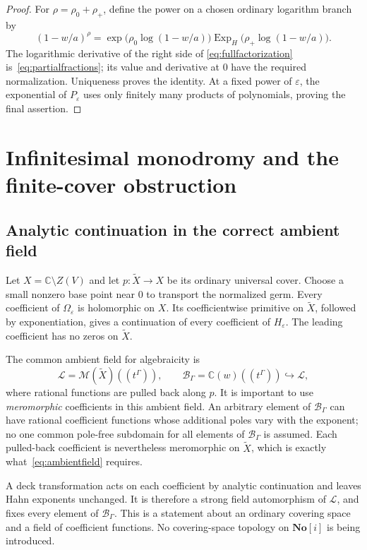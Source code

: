 \documentclass[11pt,a4paper]{article}
\numberwithin{equation}{section}
\theoremstyle{definition}
\theoremstyle{remark}
\newcommand{\C}{\mathbb C}
\newcommand{\No}{\mathbf{No}}
\newcommand{\B}{\mathscr B_\Gamma}
\newcommand{\eps}{\varepsilon}
\newcommand{\Mer}{\mathcal M}
\newcommand{\ExpH}{\operatorname{Exp}_{\!H}}
\newcommand{\Ucov}{\widetilde X}
\begin{document}
\begin{proof}
For $\rho=\rho_0+\rho_+$, define the power on a chosen ordinary logarithm
branch by
\[
 (1-w/a)^\rho
  =\exp\bigl(\rho_0\log(1-w/a)\bigr)
     \ExpH\bigl(\rho_+\log(1-w/a)\bigr).
\]
The logarithmic derivative of the right side of
\eqref{eq:fullfactorization} is~\eqref{eq:partialfractions}; its value and
derivative at $0$ have the required normalization.  Uniqueness proves the
identity.  At a fixed power of $\eps$, the exponential of $P_\eps$ uses
only finitely many products of polynomials, proving the final assertion.
\end{proof}

\section{Infinitesimal monodromy and the finite-cover obstruction}
\label{sec:monodromy}

\subsection{Analytic continuation in the correct ambient field}

Let $X=\C\setminus Z(V)$ and let $p:\Ucov\to X$ be its ordinary universal
cover.  Choose a small nonzero base point near $0$ to transport the
normalized germ.  Every coefficient of $\Omega_\eps$ is holomorphic on $X$.
Its coefficientwise primitive on $\Ucov$, followed by exponentiation, gives
a continuation of every coefficient of $H_\eps$.
The leading coefficient has no zeros on $\Ucov$.

The common ambient field for algebraicity is
\begin{equation}\label{eq:ambientfield}
 \mathscr L=\Mer(\Ucov)((t^\Gamma)),
 \qquad \B=\C(w)((t^\Gamma))\hookrightarrow\mathscr L,
\end{equation}
where rational functions are pulled back along $p$.  It is important to use
\emph{meromorphic} coefficients in this ambient field.  An arbitrary element
of $\B$ can have rational coefficient functions whose additional poles vary
with the exponent; no one common pole-free subdomain for all elements of
$\B$ is assumed.  Each pulled-back coefficient is nevertheless
meromorphic on $\Ucov$, which is exactly what~\eqref{eq:ambientfield}
requires.

A deck transformation acts on each coefficient by analytic continuation
and leaves Hahn exponents unchanged.  It is therefore a strong field
automorphism of $\mathscr L$, and fixes every element of $\B$.
This is a statement about an ordinary covering space and a field of
coefficient functions.  No covering-space topology on $\No[i]$ is being
introduced.
\end{document}
